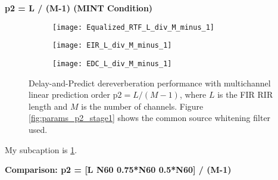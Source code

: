 \textbf{p2 = L / (M-1) (MINT Condition)}

\begin{figure}[H]
	\centering
	\begin{subfigure}[b]{0.32\textwidth}
		\centering
		\texttt{[image: Equalized\_RTF\_L\_div\_M\_minus\_1]}
	     \label{subfig:test_subfig_1}
	\end{subfigure}
	\hfill
	\begin{subfigure}[b]{0.32\textwidth}
		\centering
		\texttt{[image: EIR\_L\_div\_M\_minus\_1]}
	\end{subfigure}
	\hfill
	\begin{subfigure}[b]{0.32\textwidth}
		\centering
		\texttt{[image: EDC\_L\_div\_M\_minus\_1]}
	\end{subfigure}
	\hfill
	\caption{Delay-and-Predict dereverberation performance with multichannel linear prediction order $\mathrm{p2} = L / (M-1)$, where $L$ is the FIR RIR length and $M$ is the number of channels. Figure \ref{fig:params_p2_stage1} shows the common source whitening filter used.}
	\label{fig:params_p2_L}
\end{figure}

My subcaption is \ref{subfig:test_subfig_1}.

\textbf{Comparison: p2 = [L  N60  0.75*N60  0.5*N60] / (M-1)}

